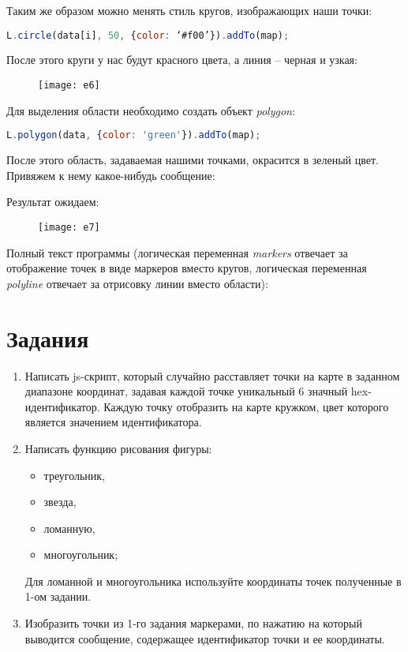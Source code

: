 Таким же образом можно менять стиль кругов, изображающих наши точки:
\begin{lstlisting}[language=js]
    L.circle(data[i], 50, {color: ‘#f00’}).addTo(map);
\end{lstlisting}

После этого круги у нас будут красного цвета, а линия -- черная и узкая:
\begin{figure}[ht!]
    \center
    \texttt{[image: e6]}
\end{figure}

Для выделения области необходимо создать объект \emph{polygon}:
\begin{lstlisting}[language=js]
    L.polygon(data, {color: 'green'}).addTo(map);
\end{lstlisting}
После этого область, задаваемая нашими точками, окрасится в зеленый цвет. 
Привяжем к нему какое-нибудь сообщение:


Результат ожидаем:
\begin{figure}[ht!]
    \center
    \texttt{[image: e7]}
\end{figure}

Полный текст программы (логическая переменная \emph{markers} отвечает за 
отображение точек в виде маркеров вместо кругов, логическая переменная 
\emph{polyline} отвечает за отрисовку линии вместо области):


\newpage

\section{Задания}
\begin{enumerate}
    \item Написать js-скрипт, который случайно расставляет точки на карте 
        в заданном диапазоне координат, задавая каждой точке уникальный 
        6 значный hex-идентификатор. Каждую точку отобразить на карте 
        кружком, цвет которого является значением идентификатора.
    \item Написать функцию рисования фигуры:
    \begin{itemize}
        \item треугольник,
        \item звезда,
        \item ломанную,
        \item многоугольник;
    \end{itemize}
    Для ломанной и многоугольника используйте координаты точек полученные 
    в 1-ом задании.
    \item Изобразить точки из 1-го задания маркерами, по нажатию на который 
        выводится сообщение, содержащее идентификатор точки и ее координаты.
\end{enumerate}

